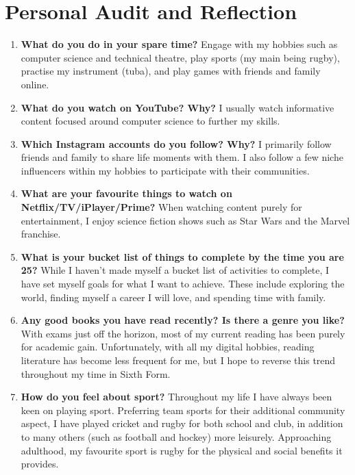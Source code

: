 \section{Personal Audit and Reflection}

\begin{enumerate}
    \item \textbf{What do you do in your spare time?} Engage with my hobbies such as computer science and technical theatre, play sports (my main being rugby), practise my instrument (tuba), and play games with friends and family online.

    \item \textbf{What do you watch on YouTube? Why?} I usually watch informative content focused around computer science to further my skills.

    \item \textbf{Which Instagram accounts do you follow? Why?} I primarily follow friends and family to share life moments with them. I also follow a few niche influencers within my hobbies to participate with their communities.

    \item \textbf{What are your favourite things to watch on Netflix/TV/iPlayer/Prime?} When watching content purely for entertainment, I enjoy science fiction shows such as Star Wars and the Marvel franchise.


    \item \textbf{What is your bucket list of things to complete by the time you are 25?} While I haven't made myself a bucket list of activities to complete, I have set myself goals for what I want to achieve. These include exploring the world, finding myself a career I will love, and spending time with family.

    \item \textbf{Any good books you have read recently? Is there a genre you like?} With exams just off the horizon, most of my current reading has been purely for academic gain. Unfortunately, with all my digital hobbies, reading literature has become less frequent for me, but I hope to reverse this trend throughout my time in Sixth Form.

    \item \textbf{How do you feel about sport?} Throughout my life I have always been keen on playing sport. Preferring team sports for their additional community aspect, I have played cricket and rugby for both school and club, in addition to many others (such as football and hockey) more leisurely. Approaching adulthood, my favourite sport is rugby for the physical and social benefits it provides.


\end{enumerate}
